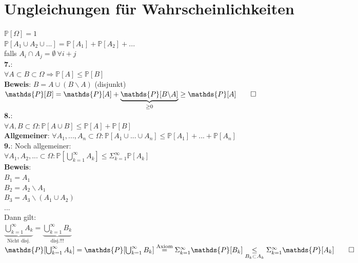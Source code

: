 \section{Ungleichungen für Wahrscheinlichkeiten}
$\mathds{P}[\Omega] = 1$\\
$\mathds{P}[A_1\cup A_2 \cup ...] = \mathds{P}[A_1] + \mathds{P}[A_2]+ ...$\\
falls $A_i \cap A_j = \emptyset \: \forall i+j$\medskip\\
\textbf{7.}:\\
$\forall  A \subset B \subset \Omega \Rightarrow \mathds{P}[A] \leq \mathds{P}[B]$\medskip\\
\textbf{Beweis}: $B=A\cup(B\backslash A)$ (disjunkt)\\
$\mathds{P}[B]=\mathds{P}[A]+\underbrace{\mathds{P}[B\backslash A]}_{\geq 0} \geq \mathds{P}[A] \qed$\medskip\\
\textbf{8.}:\\
$\forall A, B \subset \Omega : \mathds{P}[A\cup B] \leq \mathds{P}[A] + \mathds{P}[B]$\medskip\\
\textbf{Allgemeiner}: $\forall A_1,...,A_n \subset \Omega : \mathds{P}[A_1\cup ...\cup A_n] \leq \mathds{P} [A_1]+...+\mathds{P}[A_n]$\medskip\\
\textbf{9.}: Noch allgemeiner:\\
$\forall A_1,A_2,... \subset \Omega : \mathds{P}[\bigcup_{k=1}^\infty A_k] \leq \Sigma_{k=1}^\infty \mathds{P}[A_k]$\medskip\\
\textbf{Beweis}:\\
$B_1 = A_1$\\
$B_2 = A_2\backslash A_1$\\
$B_3 = A_3\backslash(A_1 \cup A_2)$\\
...\smallskip\\
Dann gilt:\\
$\underbrace{\bigcup_{k=1}^\infty A_k}_\text{Nicht disj.} = \underbrace{\bigcup_{k=1}^\infty B_k}_\text{disj.!!!}$\medskip\\
$\mathds{P}[\bigcup_{k=1}^\infty A_k] = \mathds{P}[\bigcup_{k=1}^\infty B_k] \overset{\text{Axiom}}{=}\Sigma_{k=1}^\infty \mathds{P}[B_k] \underset{B_k \subset A_k}{\leq} \Sigma_{k=1}^\infty \mathds{P}[A_k] \qed$

